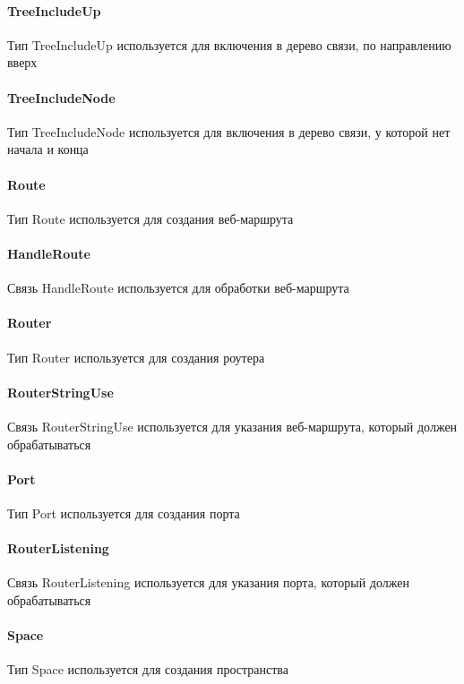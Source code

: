 \documentclass{article}
\begin{document}
\paragraph*{TreeIncludeUp}\hypertarget{Core.TreeIncludeUp.Description}{}
Тип TreeIncludeUp используется для включения в
дерево связи, по направлению вверх
\paragraph*{TreeIncludeNode}\hypertarget{Core.TreeIncludeNode.Description}{}
Тип TreeIncludeNode используется для
включения в дерево связи, у которой нет начала и конца
\paragraph*{Route}\hypertarget{Core.Route.Description}{}
Тип Route используется для создания веб-маршрута
\paragraph*{HandleRoute}\hypertarget{Core.HandleRoute.Description}{}
Связь HandleRoute используется для обработки
веб-маршрута

\paragraph*{Router}\hypertarget{Core.Router.Description}{}
Тип Router используется для создания роутера
\paragraph*{RouterStringUse}\hypertarget{Core.RouterStringUse.Description}{}
Связь RouterStringUse используется для
указания веб-маршрута, который должен обрабатываться
\paragraph*{Port}\hypertarget{Core.Port.Description}{}
Тип Port используется для создания порта
\paragraph*{RouterListening}\hypertarget{Core.RouterListening.Description}{}
Связь RouterListening используется для
указания порта, который должен обрабатываться
\paragraph*{Space}\hypertarget{Core.Space.Description}{}
Тип Space используется для создания пространства
\end{document}
